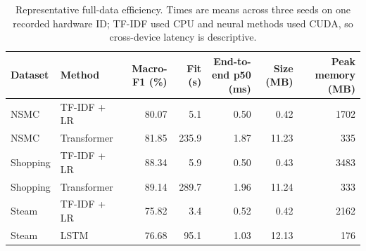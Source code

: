 \begin{table}[t]
\centering
\caption{Representative full-data efficiency. Times are means across three seeds on one recorded hardware ID; TF-IDF used CPU and neural methods used CUDA, so cross-device latency is descriptive.}
\label{tab:efficiency}
\scriptsize
\begin{tabular}{llrrrrr}
\toprule
Dataset & Method & Macro-F1 (\%) & Fit (s) & End-to-end p50 (ms) & Size (MB) & Peak memory (MB) \\
\midrule
NSMC & TF-IDF + LR & 80.07 & 5.1 & 0.50 & 0.42 & 1702 \\
NSMC & Transformer & 81.85 & 235.9 & 1.87 & 11.23 & 335 \\
Shopping & TF-IDF + LR & 88.34 & 5.9 & 0.50 & 0.43 & 3483 \\
Shopping & Transformer & 89.14 & 289.7 & 1.96 & 11.24 & 333 \\
Steam & TF-IDF + LR & 75.82 & 3.4 & 0.52 & 0.42 & 2162 \\
Steam & LSTM & 76.68 & 95.1 & 1.03 & 12.13 & 176 \\
\bottomrule
\end{tabular}
\end{table}
